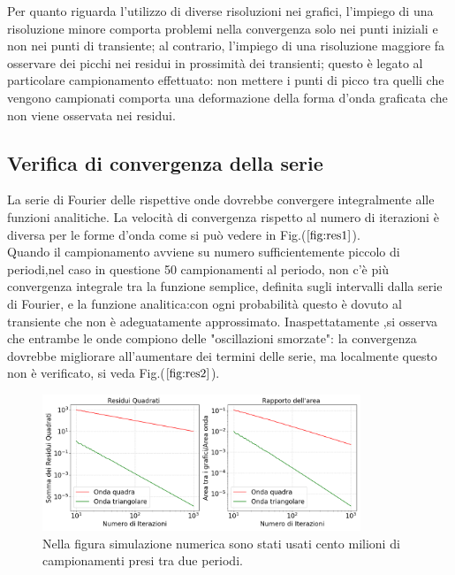 \documentclass{article}
\begin{document}
        \noindent Per quanto riguarda l'utilizzo di diverse risoluzioni nei grafici, l'impiego di una risoluzione 
        minore comporta problemi nella convergenza solo nei punti iniziali
         e non nei punti di transiente; al contrario, l'impiego di una risoluzione 
        maggiore fa osservare dei picchi nei residui in prossimità dei transienti;
        questo è legato al particolare campionamento effettuato: 
        non mettere i punti di picco tra quelli che vengono campionati 
        comporta una deformazione della forma d'onda graficata che non viene osservata 
        nei residui.




    \subsection{Verifica di convergenza della serie}
    \label{sez:residui}
       
        La serie di Fourier delle rispettive onde dovrebbe convergere integralmente alle funzioni analitiche.
        La velocità di convergenza rispetto al numero 
        di iterazioni è diversa per le forme d'onda come si può vedere 
        in Fig.($\ref{fig:res1}$).\\ 
        Quando il campionamento avviene su numero sufficientemente
        piccolo di periodi,nel caso in questione 50 campionamenti al periodo,
          non c'è più convergenza integrale tra la funzione semplice, definita sugli 
        intervalli dalla serie di Fourier, e la funzione analitica:con ogni
        probabilità questo è dovuto al transiente che non è adeguatamente approssimato.
        Inaspettatamente ,si osserva che entrambe le onde compiono delle "oscillazioni smorzate":
        la convergenza dovrebbe migliorare all'aumentare dei termini delle serie,
        ma localmente questo non è verificato, si veda Fig.($\ref{fig:res2}$).
        

        \begin{figure}[H]
            \centering
            \includegraphics[width=0.85\textwidth]{residuals1.png} %
            \caption{Nella figura simulazione numerica sono stati usati cento milioni di campionamenti presi tra due periodi.}
            \label{fig:res1}
        \end{figure}
\end{document}
